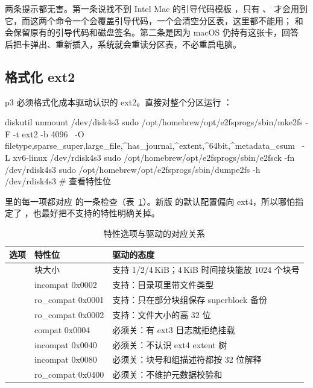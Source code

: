 两条提示都无害。第一条说找不到 Intel Mac 的引导代码模板 ，只有 、 才会用到它，而这两个命令一个会覆盖引导代码，一个会清空分区表，这里都不能用； 和  会保留原有的引导代码和磁盘签名。第二条是因为 macOS 仍持有这张卡，回答  后把卡弹出、重新插入，系统就会重读分区表，不必重启电脑。

\subsection{格式化 ext2}
\label{sec:ext2-mkfs}

p3 必须格式化成本驱动认识的 ext2。直接对整个分区运行 ：

\begin{shcode}
diskutil unmount /dev/disk4s3
sudo /opt/homebrew/opt/e2fsprogs/sbin/mke2fs -F -t ext2 -b 4096 \
  -O filetype,sparse_super,large_file,^has_journal,^extent,^64bit,^metadata_csum \
  -L xv6-linux /dev/rdisk4s3
sudo /opt/homebrew/opt/e2fsprogs/sbin/e2fsck -fn /dev/rdisk4s3
sudo /opt/homebrew/opt/e2fsprogs/sbin/dumpe2fs -h /dev/rdisk4s3   # 查看特性位
\end{shcode}

 里的每一项都对应  的一条检查（表~\ref{tab:mke2fs-opts}）。新版  的默认配置偏向 ext4，所以哪怕指定了 ，也最好把不支持的特性明确关掉。

\begin{table}[htbp]
  \centering
  \caption{ 特性选项与驱动的对应关系}
  \label{tab:mke2fs-opts}
  \small
  \begin{tabularx}{\linewidth}{@{}llX@{}}
    \toprule
    选项 & 特性位 & 驱动的态度 \\
    \midrule
    \code{-b 4096} & 块大小 & 支持 1/2/4\,KiB；4\,KiB 时间接块能放 1024 个块号 \\
    \code{filetype} & incompat 0x0002 & 支持：目录项里带文件类型 \\
    \code{sparse\_super} & ro\_compat 0x0001 & 支持：只在部分块组保存 superblock 备份 \\
    \code{large\_file} & ro\_compat 0x0002 & 支持：文件大小的高 32 位 \\
    \code{\^{}has\_journal} & compat 0x0004 & 必须关：有 ext3 日志就拒绝挂载 \\
    \code{\^{}extent} & incompat 0x0040 & 必须关：不认识 ext4 extent 树 \\
    \code{\^{}64bit} & incompat 0x0080 & 必须关：块号和组描述符都按 32 位解释 \\
    \code{\^{}metadata\_csum} & ro\_compat 0x0400 & 必须关：不维护元数据校验和 \\
    \bottomrule
  \end{tabularx}
\end{table}

